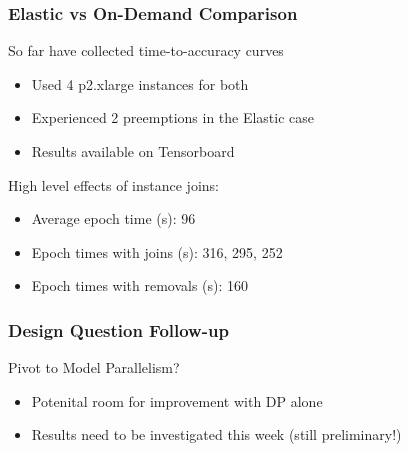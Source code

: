   \begin{frame}
    \frametitle{Elastic vs On-Demand Comparison}

    So far have collected time-to-accuracy curves
    \begin{itemize}
      \item Used 4 p2.xlarge instances for both
      \item Experienced 2 preemptions in the Elastic case
      \item Results available on Tensorboard
    \end{itemize}

    \vspace{2em}
    High level effects of instance joins:
    \begin{itemize}
      \item Average epoch time (s): 96
      \item Epoch times with joins (s): 316, 295, 252
      \item Epoch times with removals (s): 160
    \end{itemize}

  \end{frame}

  \begin{frame}
    \frametitle{Design Question Follow-up}

    Pivot to Model Parallelism?
    \begin{itemize}
      \item Potenital room for improvement with DP alone
      \item Results need to be investigated this week (still preliminary!)
    \end{itemize}
  \end{frame}

